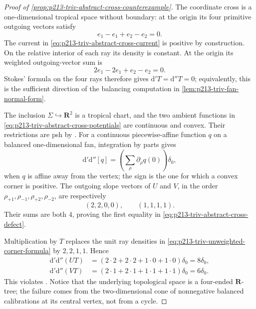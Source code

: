 \begin{proof}[Proof of
\cref{prop:p213-triv-abstract-cross-counterexample}]
The coordinate cross is a one-dimensional tropical space without boundary:
at the origin its four primitive outgoing vectors satisfy
\begin{equation}
                  e_1-e_1+e_2-e_2=0.
\label{eq:p213-triv-unit-cross-balance}
\end{equation}
The current in \eqref{eq:p213-triv-abstract-cross-current} is positive by
construction.  On the relative interior of each ray its density is constant.
At the origin its weighted outgoing-vector sum is
\begin{equation}
                  2e_1-2e_1+e_2-e_2=0.
\label{eq:p213-triv-weighted-cross-balance}
\end{equation}
Stokes' formula on the four rays therefore gives
\(\mathrm d'T=\mathrm d''T=0\); equivalently, this is the sufficient
direction of the balancing computation in
\cref{lem:p213-triv-fan-normal-form}.

The inclusion \(\Sigma\hookrightarrow\mathbf R^2\) is a tropical chart, and
the two ambient functions in
\eqref{eq:p213-triv-abstract-cross-potentials} are continuous and convex.
Their restrictions are psh by
\cite[Proposition~8.2.5]{CLD25}.  For a continuous piecewise-affine function
\(q\) on a balanced one-dimensional fan, integration by parts gives
\begin{equation}
 \mathrm d'\mathrm d''[q]
   =\left(\sum_{\rho}\partial_{\rho}q(0)\right)\delta_0,
\label{eq:p213-triv-unweighted-corner-formula}
\end{equation}
when \(q\) is affine away from the vertex; the sign is the one for which a
convex corner is positive.  The outgoing slope vectors of \(U\) and \(V\),
in the order
\(\rho_{+1},\rho_{-1},\rho_{+2},\rho_{-2}\), are respectively
\begin{equation}
                         (2,2,0,0),
       \qquad            (1,1,1,1).
\label{eq:p213-triv-abstract-cross-slopes}
\end{equation}
Their sums are both \(4\), proving the first equality in
\eqref{eq:p213-triv-abstract-cross-defect}.

Multiplication by \(T\) replaces the unit ray densities in
\eqref{eq:p213-triv-unweighted-corner-formula} by \(2,2,1,1\).  Hence
\begin{equation}
 \begin{aligned}
  \mathrm d'\mathrm d''(UT)
     &=(2\cdot2+2\cdot2+1\cdot0+1\cdot0)\delta_0
       =8\delta_0,\\
  \mathrm d'\mathrm d''(VT)
     &=(2\cdot1+2\cdot1+1\cdot1+1\cdot1)\delta_0
       =6\delta_0.
 \end{aligned}
\label{eq:p213-triv-weighted-corner-computation}
\end{equation}
This violates \cite[Definition~8.6.2]{CLD25}.  Notice that the underlying
topological space is a four-ended \(\mathbf R\)-tree; the failure comes from
the two-dimensional cone of nonnegative balanced calibrations at its central
vertex, not from a cycle.
\end{proof}

